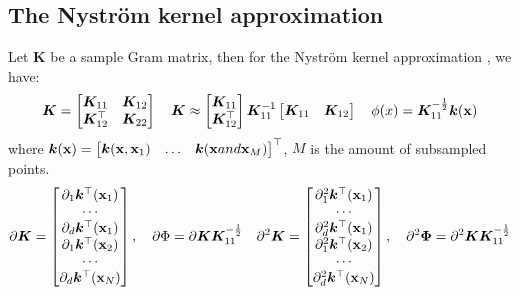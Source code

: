 \subsection{The Nystr\"{o}m kernel approximation}
\label{sec:Nystrom}
Let ${\bm K}$ be a sample Gram matrix, then for the Nystr\"{o}m kernel approximation \cite{Chen2016ErrorAO}, we have:
\[
    {\bm K} =
    \begin{bmatrix}
        {\bm K}_{11} & {\bm K}_{12}\\
        {\bm K}_{12}^{\top} & {\bm K}_{22}
    \end{bmatrix}
    \quad
    {\bm K} \approx
    \begin{bmatrix}
        {\bm K}_{11}\\
        {\bm K}_{12}^{\top}
    \end{bmatrix}
    {\bm K}_{11}^{-1}
    \begin{bmatrix}
        {\bm K}_{11} & {\bm K}_{12}
    \end{bmatrix}
    \quad
    \phi(x) =
    {\bm K}_{11}^{-\frac{1}{2}}{\bm k}({\bf x})
\]
where ${\bm k}({\bf x}) = \begin{bmatrix} {\bm k}({\bf x}, {\bf x}_1) & \ldots & {\bm k}({\bf x} and {\bf x}_M)\end{bmatrix}^{\top}$, $M$ is the amount of subsampled points.
\[
    \partial {\bm K} = \begin{bmatrix}
        \partial_1 {\bm k}^\top({\bf x}_1) \\
        \cdots \\
        \partial_d {\bm k}^\top({\bf x}_1) \\
        \partial_1 {\bm k}^\top({\bf x}_2) \\
        \cdots \\
        \partial_d {\bm k}^\top({\bf x}_N)
    \end{bmatrix},
    \quad
    \partial \Phi = \partial {\bm K} {\bm K}_{11}^{-\frac{1}{2}}
    \quad
    \partial^2 {\bm K} = \begin{bmatrix}
        \partial_1^2 {\bm k}^\top({\bf x}_1) \\
        \cdots \\
        \partial_d^2 {\bm k}^\top({\bf x}_1) \\
        \partial_1^2 {\bm k}^\top({\bf x}_2) \\
        \cdots \\
        \partial_d^2 {\bm k}^\top({\bf x}_N)
    \end{bmatrix},
    \quad
    \partial^2 {\bm \Phi} = \partial^2 {\bm K} {\bm K}_{11}^{-\frac{1}{2}}
\]
